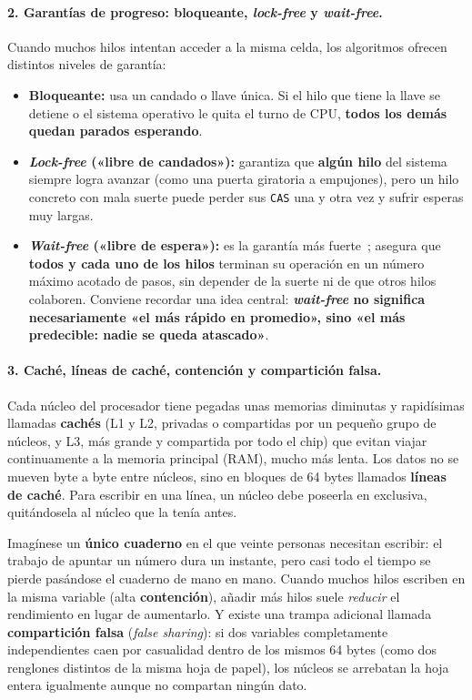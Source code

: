 \documentclass[11pt,a4paper]{article}
\begin{document}
\paragraph{2. Garantías de progreso: bloqueante, \emph{lock-free} y \emph{wait-free}.}
Cuando muchos hilos intentan acceder a la misma celda, los algoritmos ofrecen distintos niveles de garantía:
\begin{itemize}
  \item \textbf{Bloqueante:} usa un candado o llave única. Si el hilo que tiene la llave se detiene o el sistema operativo le quita el turno de CPU, \textbf{todos los demás quedan parados esperando}.
  \item \textbf{\emph{Lock-free} («libre de candados»):} garantiza que \textbf{algún hilo} del sistema siempre logra avanzar (como una puerta giratoria a empujones), pero un hilo concreto con mala suerte puede perder sus \texttt{CAS} una y otra vez y sufrir esperas muy largas.
  \item \textbf{\emph{Wait-free} («libre de espera»):} es la garantía más fuerte~\cite{herlihy1991waitfree}; asegura que \textbf{todos y cada uno de los hilos} terminan su operación en un número máximo acotado de pasos, sin depender de la suerte ni de que otros hilos colaboren. Conviene recordar una idea central: \textbf{\emph{wait-free} no significa necesariamente «el más rápido en promedio», sino «el más predecible: nadie se queda atascado»}.
\end{itemize}

\paragraph{3. Caché, líneas de caché, contención y compartición falsa.}
Cada núcleo del procesador tiene pegadas unas memorias diminutas y rapidísimas llamadas \textbf{cachés} (L1 y L2, privadas o compartidas por un pequeño grupo de núcleos, y L3, más grande y compartida por todo el chip) que evitan viajar continuamente a la memoria principal (RAM), mucho más lenta. Los datos no se mueven byte a byte entre núcleos, sino en bloques de 64 bytes llamados \textbf{líneas de caché}. Para escribir en una línea, un núcleo debe poseerla en exclusiva, quitándosela al núcleo que la tenía antes.

Imagínese un \textbf{único cuaderno} en el que veinte personas necesitan escribir: el trabajo de apuntar un número dura un instante, pero casi todo el tiempo se pierde pasándose el cuaderno de mano en mano. Cuando muchos hilos escriben en la misma variable (alta \textbf{contención}), añadir más hilos suele \emph{reducir} el rendimiento en lugar de aumentarlo. Y existe una trampa adicional llamada \textbf{compartición falsa} (\emph{false sharing}): si dos variables completamente independientes caen por casualidad dentro de los mismos 64 bytes (como dos renglones distintos de la misma hoja de papel), los núcleos se arrebatan la hoja entera igualmente aunque no compartan ningún dato.
\end{document}
